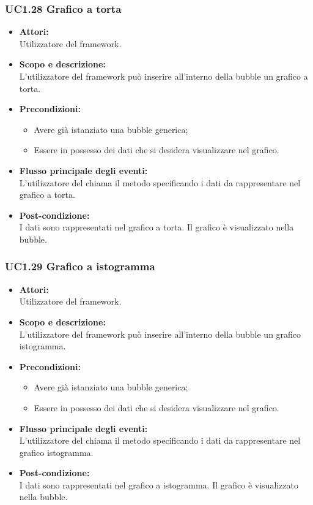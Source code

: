 \subsubsection{UC1.28 Grafico a torta} \label{UC1.28}

\begin{itemize}
	\item \textbf{Attori:}
	\\Utilizzatore del framework.
	\item \textbf{Scopo e descrizione:} 
	\\L’utilizzatore del framework può inserire all'interno della bubble un grafico a torta.
	\item \textbf{Precondizioni:}
	\begin{itemize}
		\item Avere già istanziato una bubble generica;
		\item Essere in possesso dei dati che si desidera visualizzare nel grafico.
	\end{itemize}
	\item \textbf{Flusso principale degli eventi:}
	\\L’utilizzatore del  chiama il metodo specificando i dati da rappresentare nel grafico a torta.
	\item \textbf{Post-condizione:}
	\\I dati sono rappresentati nel grafico a torta. Il grafico è visualizzato nella bubble.
\end{itemize}

\subsubsection{UC1.29 Grafico a istogramma} \label{UC1.29}

\begin{itemize}
	\item \textbf{Attori:}
	\\Utilizzatore del framework.
	\item \textbf{Scopo e descrizione:} 
	\\L’utilizzatore del framework può inserire all'interno della bubble un grafico istogramma.
	\item \textbf{Precondizioni:}
	\begin{itemize}
		\item Avere già istanziato una bubble generica;
		\item Essere in possesso dei dati che si desidera visualizzare nel grafico.
	\end{itemize}
	\item \textbf{Flusso principale degli eventi:}
	\\L’utilizzatore del  chiama il metodo specificando i dati da rappresentare nel grafico istogramma.
	\item \textbf{Post-condizione:}
	\\I dati sono rappresentati nel grafico a istogramma. Il grafico è visualizzato nella bubble.
\end{itemize}


